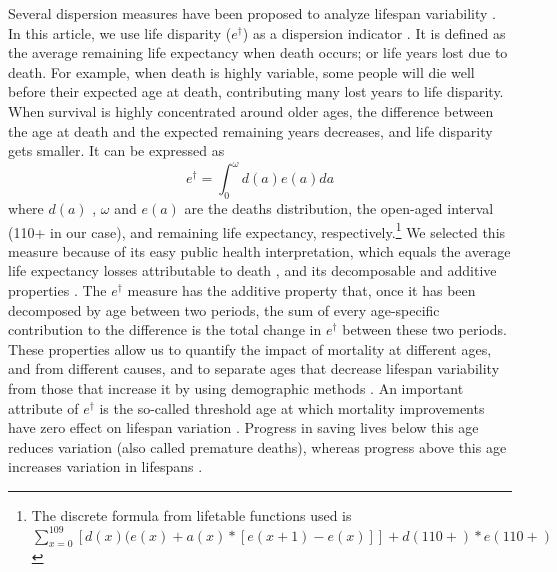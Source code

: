 \documentclass{article}
\begin{document}
\begin{spacing}{1.5}
 
Several dispersion measures have been proposed to analyze lifespan variability \citep{vanraalte2013, wilmoth1999}. In this article, we use life disparity ($e^{\dagger}$) as a dispersion indicator \citep{vaupel&Canudas2003}. It is defined as the average remaining life expectancy when death occurs; or life years lost due to death.  For example, when death is highly variable, some people will die well before their expected age at death, contributing many lost years to life disparity. When survival is highly concentrated around older ages, the difference between the age at death and the expected remaining years decreases, and life disparity gets smaller.  It can be expressed as
\begin{equation}
\label{eq.edagger}
e^{\dagger}=\int_0^\omega d(a)e(a)da
\end{equation}
where $d(a)$ , $\omega$ and $e(a)$ are the deaths distribution, the open-aged interval (110+ in our case), and remaining life expectancy, respectively.\footnote{The discrete formula from lifetable functions used is $\sum_{x=0}^{109}[d(x)(e(x) + a(x)*[e(x+1)-e(x)]] + d(110+)*e(110+)$} 
We selected this measure because of its easy public health interpretation, which equals the average life expectancy losses attributable to death \citep{shkolnikov2011}, and its decomposable and additive properties \citep{zhang2009}. The $e^\dagger$ measure has the additive property that, once it has been decomposed by age between two periods, the sum of every age-specific contribution to the difference is the total change in $e^\dagger$ between these two periods. These properties allow us to quantify the impact of mortality at different ages, and from different causes, and to separate ages that decrease lifespan variability from those that increase it by using demographic methods \citep{zhang2009, shkolnikov2011}. An important attribute of $e^\dagger$ is the so-called threshold age at which mortality improvements have zero effect on lifespan variation \citep{zhang2009}. Progress in saving lives below this age reduces variation (also called premature deaths), whereas progress above this age increases variation in lifespans \citep{vaupel2011}.\\


\end{spacing}
\end{document}
